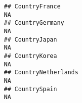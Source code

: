 \documentclass[]{article}
\begin{document}
\begin{verbatim}
## CountryFrance                                                                                                                                                                                                                                                                                                                                                                                                                                                                         NA
## CountryGermany                                                                                                                                                                                                                                                                                                                                                                                                                                                                        NA
## CountryJapan                                                                                                                                                                                                                                                                                                                                                                                                                                                                          NA
## CountryKorea                                                                                                                                                                                                                                                                                                                                                                                                                                                                          NA
## CountryNetherlands                                                                                                                                                                                                                                                                                                                                                                                                                                                                    NA
## CountrySpain                                                                                                                                                                                                                                                                                                                                                                                                                                                                          NA

\end{verbatim}
\end{document}
